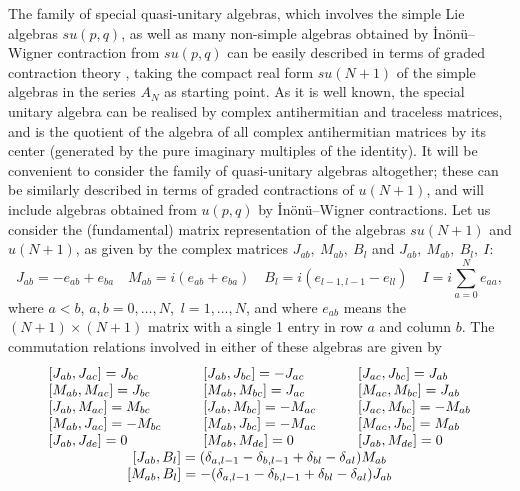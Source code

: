 \documentclass[12pt]{article}
\begin{document}
The family of special quasi-unitary algebras, which involves the simple
Lie algebras $su(p,q)$, as well as many non-simple algebras obtained
by \.In\"on\"u--Wigner \cite{Ino.Wig:53} contraction from $su(p,q)$ can be
easily described in terms of graded contraction theory
\cite{Mon.Pat:91,Moo.Pat:91}, taking the compact real form
$su(N+1)$ of the simple algebras in the series
$A_N$ as starting point. As it is well known, the special unitary algebra
can be realised by complex antihermitian and traceless matrices, and is the
quotient of the algebra of all complex antihermitian matrices by its
center (generated by the pure imaginary multiples of the identity). It
 will be convenient to consider the family of quasi-unitary algebras
altogether; these can be similarly described in terms of graded
contractions of $u(N+1)$, and will include algebras obtained from $u(p,q)$
by \.In\"on\"u--Wigner contractions. Let us consider the (fundamental)
matrix representation of the algebras
$su(N+1)$ and
$u(N+1)$, as given by the complex matrices
${J}_{ab},\ {M}_{ab},\ {B}_l$ and ${J}_{ab},\ {M}_{ab},\ {B}_l,\ {I}$:
\begin{equation}
{J}_{ab}=-e_{ab}+e_{ba}  \quad
{M}_{ab}=i(e_{ab}+e_{ba})  \quad
{B}_l=i(e_{l-1,l-1}-e_{ll})  \quad
{I}=i \sum_{a=0}^{N}e_{aa} ,
\label{usuRealMat}
\end{equation}
where $a<b$, $a,b=0,\dots,N$,\  $l=1,\dots,N$, and where $e_{ab}$ means
the $(N+1) \times (N+1)$ matrix with a single  1 entry in row $a$ and
column $b$. The commutation relations involved in either of these
algebras are given by
\begin{equation}
\begin{array}{lll}
[{J}_{ab},{J}_{ac}] = {J}_{bc} &\qquad
[{J}_{ab},{J}_{bc}] =-{J}_{ac} &\qquad
[{J}_{ac},{J}_{bc}] = {J}_{ab}\\{}
[{M}_{ab},{M}_{ac}] = {J}_{bc} &\qquad
[{M}_{ab},{M}_{bc}] = {J}_{ac} &\qquad
[{M}_{ac},{M}_{bc}] = {J}_{ab} \\{}
[{J}_{ab},{M}_{ac}] = {M}_{bc} &\qquad
[{J}_{ab},{M}_{bc}] =-{M}_{ac} &\qquad
[{J}_{ac},{M}_{bc}] =-{M}_{ab}\\{}
[{M}_{ab},{J}_{ac}] =-{M}_{bc} &\qquad
[{M}_{ab},{J}_{bc}] =-{M}_{ac} &\qquad
[{M}_{ac},{J}_{bc}] = {M}_{ab} \\{}
[{J}_{ab},{J}_{de}]= 0 &\qquad
[{M}_{ab},{M}_{de}] =0 &\qquad
[{J}_{ab},{M}_{de}] =0 \\
\multicolumn{3}{c}{
  [{J}_{ab},{B}_l] = ( \delta_{a,l-1} -\delta_{b,l-1}  +
   \delta_{bl} -\delta_{al}){M}_{ab}} \\
\multicolumn{3}{c}{
  [{M}_{ab},{B}_l] = - ( \delta_{a,l-1} -\delta_{b,l-1}  +
   \delta_{bl} -\delta_{al}){J}_{ab}}
\end{array}
\label{usuCR}
\end{equation}
\end{document}
